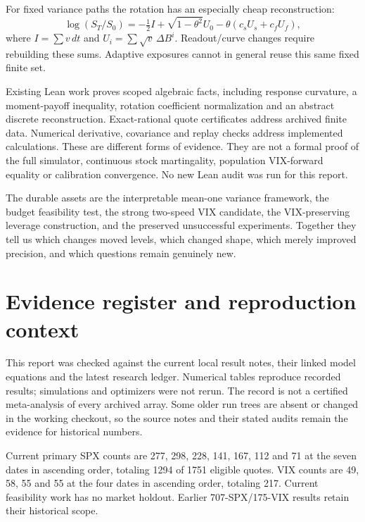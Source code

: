 \documentclass[11pt,a4paper]{article}
\begin{document}
For fixed variance paths the rotation has an especially cheap reconstruction:
\begin{equation}
\log(S_T/S_0)=-\tfrac12 I+\sqrt{1-\theta^2}U_0-\theta(c_sU_s+c_fU_f),
\end{equation}
where $I=\sum v\,dt$ and $U_i=\sum\sqrt v\,\Delta B^i$. Readout/curve changes require rebuilding these sums. Adaptive exposures cannot in general reuse this same fixed finite set.

Existing Lean work proves scoped algebraic facts, including response curvature, a moment-payoff inequality, rotation coefficient normalization and an abstract discrete reconstruction. Exact-rational quote certificates address archived finite data. Numerical derivative, covariance and replay checks address implemented calculations. These are different forms of evidence. They are not a formal proof of the full simulator, continuous stock martingality, population VIX-forward equality or calibration convergence. No new Lean audit was run for this report.

The durable assets are the interpretable mean-one variance framework, the budget feasibility test, the strong two-speed VIX candidate, the VIX-preserving leverage construction, and the preserved unsuccessful experiments. Together they tell us which changes moved levels, which changed shape, which merely improved precision, and which questions remain genuinely new.

\appendix
\section{Evidence register and reproduction context}
This report was checked against the current local result notes, their linked model equations and the latest research ledger. Numerical tables reproduce recorded results; simulations and optimizers were not rerun. The record is not a certified meta-analysis of every archived array. Some older run trees are absent or changed in the working checkout, so the source notes and their stated audits remain the evidence for historical numbers.

Current primary SPX counts are 277, 298, 228, 141, 167, 112 and 71 at the seven dates in ascending order, totaling 1294 of 1751 eligible quotes. VIX counts are 49, 58, 55 and 55 at the four dates in ascending order, totaling 217. Current feasibility work has no market holdout. Earlier 707-SPX/175-VIX results retain their historical scope.
\end{document}
